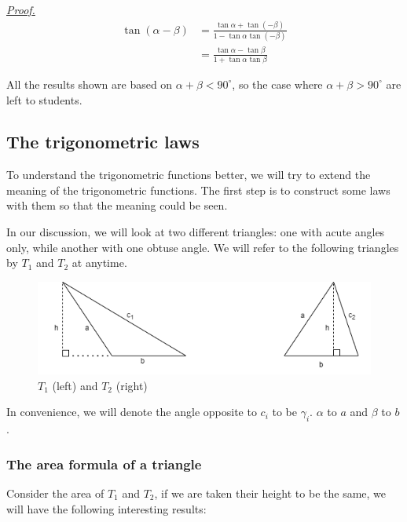 \documentclass[12pt]{article}
\renewenvironment{proof}[1][Proof]{\begin{snugshade*} \underline{\textit{{#1}.}}\\}{\hfill \qedsymbol \end{snugshade*}}
\begin{document}
    \begin{proof}
        \begin{align*}
            \tan(\alpha-\beta)&=\frac{\tan{\alpha}+\tan(-\beta)}{1-\tan{\alpha}\tan(-\beta)}\\
            &=\frac{\tan{\alpha}-\tan{\beta}}{1+\tan{\alpha}\tan{\beta}}
        \end{align*}
    \end{proof}

    All the results shown are based on $\alpha+\beta<90^\circ$, so the case where $\alpha+\beta>90^\circ$ are left to students.

    \subsection{The trigonometric laws}

    To understand the trigonometric functions better, we will try to extend the meaning of the trigonometric functions. The first step is to construct some laws with them so that the meaning could be seen.

    In our discussion, we will look at two different triangles: one with acute angles only, while another with one obtuse angle. We will refer to the following triangles by $T_1$ and $T_2$ at anytime.

    \begin{figure}[H]
        \centering
        \includegraphics[scale=0.8]{triangles.png}
        \caption{$T_1$ (left) and $T_2$ (right)}
    \end{figure}

    In convenience, we will denote the angle opposite to $c_i$ to be $\gamma_i$. $\alpha$ to $a$ and $\beta$ to $b$.

    \subsubsection*{The area formula of a triangle}

    Consider the area of $T_1$ and $T_2$, if we are taken their height to be the same, we will have the following interesting results:
\end{document}
